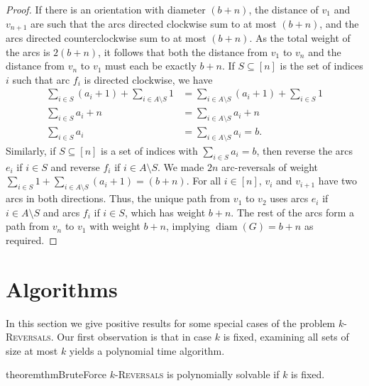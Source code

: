 \documentclass[11pt, twoside]{article}
\numberwithin{equation}{section}
\numberwithin{table}{section}
\numberwithin{figure}{section}
\theoremstyle{definition}
\theoremstyle{definition}
\theoremstyle{definition}
\begin{document}
\begin{proof}
   If there is an orientation with diameter $(b+n)$, the distance of $v_1$ and $v_{n+1}$ are such that the arcs directed clockwise  sum to at most $(b+n)$, and the arcs directed counterclockwise sum to at most $(b+n)$.
   As the total weight of the arcs is $2(b + n)$, it follows that both the distance from $v_1$ to $v_n$ and the distance from $v_n$ to $v_1$ must each be exactly $b + n$. If $S\subseteq [n]$ is the set of indices $i$ such that arc $f_i$ is directed clockwise, we have
    \vspace{-1ex}
    \begin{align*}
       \sum_{i\in S} (a_i+1) + \sum_{i \in A \setminus S} 1 &= \sum_{i \in A \setminus S} (a_i+1) + \sum_{i\in S} 1\\
       \sum_{i\in S} a_i + n &= \sum_{i \in A \setminus S} a_i + n\\
       \sum_{i\in S} a_i &= \sum_{i \in A \setminus S} a_i = b.
    \end{align*}
    Similarly, if $S\subseteq [n]$ is a set of indices with $\sum_{i \in S}a_i=b$,
    then reverse the arcs $e_i$ if $i \in S$ and reverse $f_i$ if $i \in A \setminus S$. We made $2n$ arc-reversals of weight $\sum_{i\in S} 1 + \sum_{i\in A \setminus S} (a_i+1) = (b+n)$. For all $i\in [n]$, $v_{i}$ and $v_{i+1}$ have two arcs in both directions. Thus, the unique path from $v_1$ to $v_2$ uses arcs $e_i$ if $i \in A \setminus S$ and arcs $f_i$ if $i \in S$, which has weight $b + n$. The rest of the arcs form a path from $v_n$ to $v_1$ with weight $b+n$, implying $\operatorname{diam}(G) = b+n$ as required.    
\end{proof}

\section{Algorithms} \label{sec:algorithm}
In this section we give positive results for some special cases of the problem \textsc{$k$-Reversals}. Our first observation is that in case $k$ is fixed, examining all sets of size at most $k$ yields a polynomial time algorithm.

\begin{restatable}[$\star$]{theorem}{thmBruteForce} \label{thm:bruteforce}
    \textsc{$k$-Reversals} is polynomially solvable if $k$ is fixed.
\end{restatable} 



\end{document}
